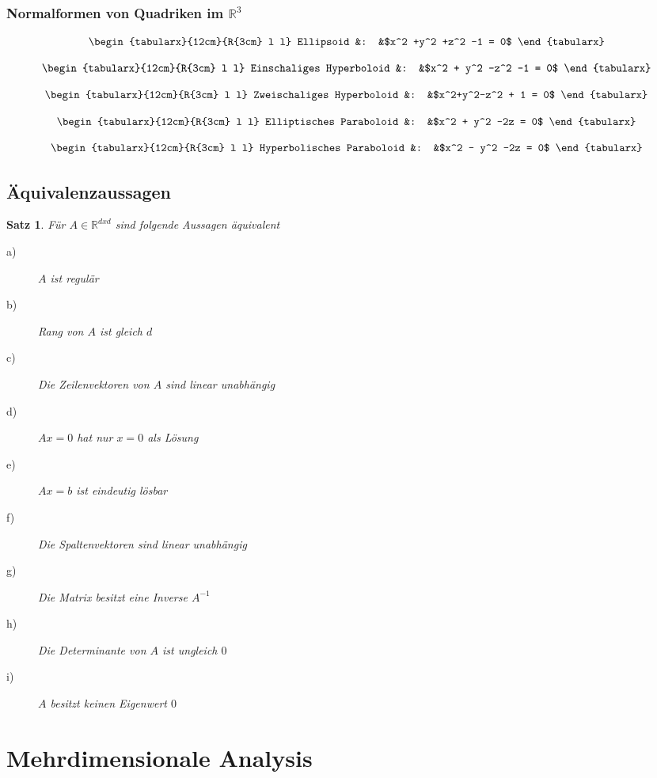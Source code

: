 \documentclass[12pt,a4paper]{article}%
\newtheorem{satz}{Satz}[section]
\numberwithin{equation}{section}
\newcommand{\R}{\mathbb{R}} %
\def\formTab#1#2{
\begin{equation}
  \begin{tabularx}{12cm}{R{3cm} l l}
    #1 &: &$#2$
  \end{tabularx}
\end{equation}
}
\numberwithin{equation}{subsection}
\begin{document}
     \subsubsection{Normalformen von Quadriken im $\R^3$}
     \formTab{Ellipsoid}{x^2 +y^2 +z^2 -1 = 0}
     \formTab{Einschaliges Hyperboloid}{x^2 + y^2 -z^2 -1 = 0}
     \formTab{Zweischaliges Hyperboloid}{x^2+y^2-z^2 + 1 = 0}
     \formTab{Elliptisches Paraboloid}{x^2 + y^2 -2z = 0}
     \formTab{Hyperbolisches Paraboloid}{x^2 - y^2 -2z = 0}
     
     
     
  \subsection{Äquivalenzaussagen}
  \begin{satz}
  Für $A \in \R^{dxd}$ sind folgende Aussagen äquivalent
  \begin{description}
   \item[a)] $A$ ist regulär
   \item[b)] Rang von $A$ ist gleich $d$
   \item[c)] Die Zeilenvektoren von $A$ sind linear unabhängig
   \item[d)] $Ax = 0$ hat nur $x=0$ als Lösung
   \item[e)] $Ax = b$ ist eindeutig lösbar
   \item[f)] Die Spaltenvektoren sind linear unabhängig
   \item[g)] Die Matrix besitzt eine Inverse $A^{-1}$
   \item[h)] Die Determinante von $A$ ist ungleich $0$
   \item[i)] $A$ besitzt keinen Eigenwert $0$
  \end{description}
  \end{satz}
  \newpage

\section{Mehrdimensionale Analysis}
\end{document}
